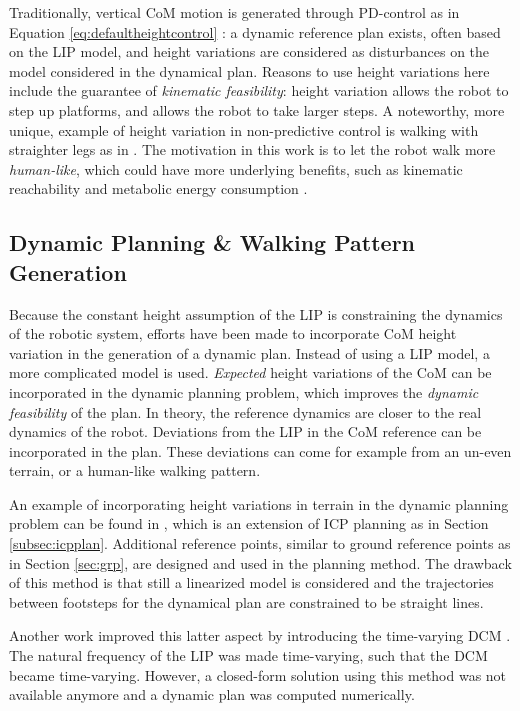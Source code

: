 Traditionally, vertical \ac{CoM} motion is generated through PD-control as in Equation \eqref{eq:defaultheightcontrol} \cite{kajita2003resolved, koolen2016design}: a dynamic reference plan exists, often based on the LIP model, and height variations are considered as disturbances on the model considered in the dynamical plan. Reasons to use height variations here include the guarantee of \textit{kinematic feasibility}: height variation allows the robot to step up platforms, and allows the robot to take larger steps. A noteworthy, more unique, example of height variation in non-predictive control is walking with straighter legs as in \cite{griffin2018straight}. The motivation in this work is to let the robot walk more \textit{human-like}, which could have more underlying benefits, such as kinematic reachability and metabolic energy consumption \cite{wang2012optimizing}.

\subsection{Dynamic Planning \& Walking Pattern Generation}
Because the constant height assumption of the \ac{LIP} is constraining the dynamics of the robotic system, efforts have been made to incorporate CoM height variation in the generation of a dynamic plan. Instead of using a LIP model, a more complicated model is used. \textit{Expected} height variations of the CoM can be incorporated in the dynamic planning problem, which improves the \textit{dynamic feasibility} of the plan. In theory, the reference dynamics are closer to the real dynamics of the robot. Deviations from the \ac{LIP} in the \ac{CoM} reference can be incorporated in the plan. These deviations can come for example from an un-even terrain, or a human-like walking pattern.

An example of incorporating height variations in terrain in the dynamic planning problem can be found in \cite{englsberger2013three}, which is an extension of \ac{ICP} planning as in Section \ref{subsec:icpplan}. Additional reference points, similar to ground reference points as in Section \ref{sec:grp}, are designed and used in the planning method. The drawback of this method is that still a linearized model is considered and the trajectories between footsteps for the dynamical plan are constrained to be straight lines. 

Another work improved this latter aspect by introducing the time-varying \ac{DCM} \cite{hopkins2014humanoid}. The natural frequency of the \ac{LIP} was made time-varying, such that the \ac{DCM} became time-varying. However, a closed-form solution using this method was not available anymore and a dynamic plan was computed numerically.

